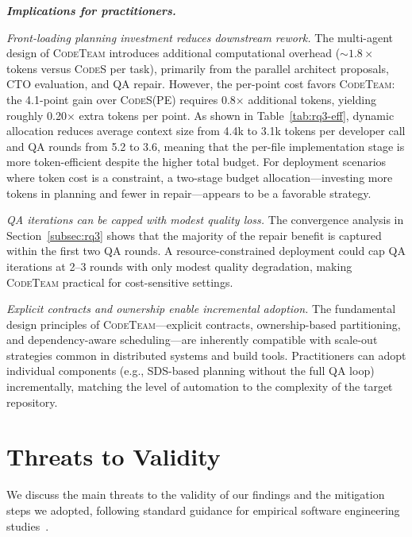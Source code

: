 \documentclass[format=acmsmall, review=false, screen=true]{acmart}
\newcommand{\fakesection}[2][1em]{\vspace{#1}\noindent\textit{\textbf{#2}}}
\newcommand{\tool}{\textsc{CodeTeam}\xspace}
\newcommand{\codes}{\textsc{CodeS}\xspace}
\begin{document}
\fakesection{Implications for practitioners.}

\emph{Front-loading planning investment reduces downstream rework.}
The multi-agent design of \tool introduces additional computational overhead (${\sim}1.8{\times}$ tokens versus \codes per task), primarily from the parallel architect proposals, CTO evaluation, and QA repair.
However, the per-point cost favors \tool: the 4.1-point gain over \codes (PE) requires 0.8$\times$ additional tokens, yielding roughly 0.20$\times$ extra tokens per point.
As shown in Table~\ref{tab:rq3-eff}, dynamic allocation reduces average context size from 4.4k to 3.1k tokens per developer call and QA rounds from 5.2 to 3.6, meaning that the per-file implementation stage is more token-efficient despite the higher total budget.
For deployment scenarios where token cost is a constraint, a two-stage budget allocation---investing more tokens in planning and fewer in repair---appears to be a favorable strategy.

\emph{QA iterations can be capped with modest quality loss.}
The convergence analysis in Section~\ref{subsec:rq3} shows that the majority of the repair benefit is captured within the first two QA rounds.
A resource-constrained deployment could cap QA iterations at 2--3 rounds with only modest quality degradation, making \tool practical for cost-sensitive settings.

\emph{Explicit contracts and ownership enable incremental adoption.}
The fundamental design principles of \tool---explicit contracts, ownership-based partitioning, and dependency-aware scheduling---are inherently compatible with scale-out strategies common in distributed systems and build tools.
Practitioners can adopt individual components (e.g., SDS-based planning without the full QA loop) incrementally, matching the level of automation to the complexity of the target repository.

\section{Threats to Validity}\label{sec:threats}
We discuss the main threats to the validity of our findings and the mitigation steps we adopted, following standard guidance for empirical software engineering studies~\cite{Wohlin2012ESE}.
\end{document}

